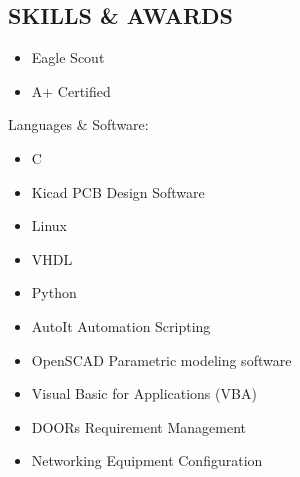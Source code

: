 \documentclass[line,mmmargin]{res}
\begin{document}
\begin{resume}
\section{SKILLS \& AWARDS} 
		\begin{multicols}{2}
			\begin{itemize}
				\itemsep -2pt
				\item[] Eagle Scout
				\item[] A+ Certified
			\end{itemize}
		\end{multicols}
	\vspace{-10pt}
	{Languages \& Software:} %
		\begin{multicols}{2}
			\begin{itemize}
				\itemsep -2pt
				\item[] C
				\item[] Kicad PCB Design Software
				\item[] Linux
				\item[] VHDL
				\item[] Python
				\item[] AutoIt Automation Scripting
				\item[] OpenSCAD Parametric modeling software
				\item[] Visual Basic for Applications (VBA)
				\item[] DOORs Requirement Management
				\item[] Networking Equipment Configuration


\end{itemize}
\end{multicols}
\end{resume}
\end{document}
